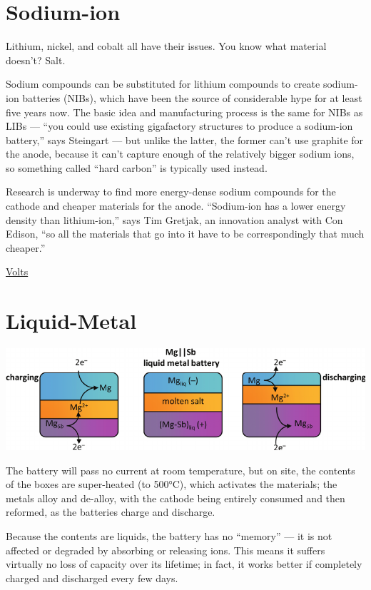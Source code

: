 \documentclass[
]{book}
\begin{document}
\hypertarget{sodium-ion}{%
\section{Sodium-ion}\label{sodium-ion}}

Lithium, nickel, and cobalt all have their issues. You know what material doesn't? Salt.

Sodium compounds can be substituted for lithium compounds to create sodium-ion batteries (NIBs), which have been the source of considerable hype for at least five years now. The basic idea and manufacturing process is the same for NIBs as LIBs --- ``you could use existing gigafactory structures to produce a sodium-ion battery,'' says Steingart --- but unlike the latter, the former can't use graphite for the anode, because it can't capture enough of the relatively bigger sodium ions, so something called ``hard carbon'' is typically used instead.

Research is underway to find more energy-dense sodium compounds for the cathode and cheaper materials for the anode. ``Sodium-ion has a lower energy density than lithium-ion,'' says Tim Gretjak, an innovation analyst with Con Edison, ``so all the materials that go into it have to be correspondingly that much cheaper.''

\href{https://www.volts.wtf/p/battery-week-competitors-to-lithium}{Volts}

\hypertarget{liquid-metal}{%
\section{Liquid-Metal}\label{liquid-metal}}

\includegraphics{fig/liquid_metal_battery.png}

The battery will pass no current at room temperature, but on site, the contents of the boxes are super-heated (to 500°C), which activates the materials; the metals alloy and de-alloy, with the cathode being entirely consumed and then reformed, as the batteries charge and discharge.

Because the contents are liquids, the battery has no ``memory'' --- it is not affected or degraded by absorbing or releasing ions. This means it suffers virtually no loss of capacity over its lifetime; in fact, it works better if completely charged and discharged every few days.
\end{document}
